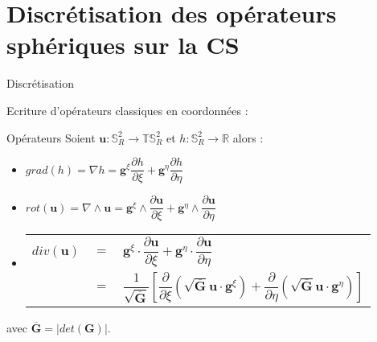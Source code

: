 \documentclass[11pt]{beamer}
\begin{document}
\section{Discrétisation des opérateurs sphériques sur la CS}
\begin{frame}{Discrétisation}

Ecriture d'opérateurs classiques en coordonnées :

\begin{block}{Opérateurs}
Soient $\mathbf{u} : \mathbb{S}_R^2 \longrightarrow \mathbb{T}\mathbb{S}_R^2$ et $h : \mathbb{S}_R^2 \longrightarrow \mathbb{R}$ alors :

\begin{itemize}
\item $grad(h) = \nabla h = \mathbf{g}^{\xi} \dfrac{\partial h}{\partial \xi} + \mathbf{g}^{\eta} \dfrac{\partial h}{\partial \eta}$\\

\item $rot( \mathbf{u} ) =\nabla \wedge \mathbf{u} = \mathbf{g}^{\xi} \wedge \dfrac{\partial \mathbf{u}}{\partial \xi} + \mathbf{g}^{\eta} \wedge \dfrac{\partial \mathbf{u}}{\partial \eta}$\\

\item

\begin{tabular}{rcl}
$div(\mathbf{u})$ & $=$ & $\mathbf{g}^{\xi} \cdot \dfrac{\partial \mathbf{u}}{\partial \xi}+\mathbf{g}^{\eta} \cdot \dfrac{\partial \mathbf{u}}{\partial \eta}$\\
                  & $=$ & $\dfrac{1}{\sqrt{\overline{\mathbf{G}}}} \left[ \dfrac{\partial}{\partial \xi} \left( \sqrt{\overline{\mathbf{G}}} \mathbf{u} \cdot \mathbf{g}^{\xi} \right) + \dfrac{\partial}{\partial \eta} \left( \sqrt{\overline{\mathbf{G}}} \mathbf{u} \cdot \mathbf{g}^{\eta} \right) \right]$
\end{tabular}
\end{itemize}
\end{block}

avec $\overline{\mathbf{G}} = |det(\mathbf{G})|$.
\end{frame}
\end{document}
